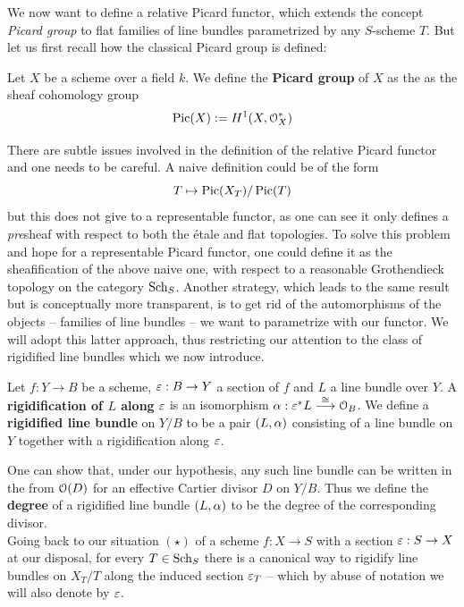 	We now want to define a relative Picard functor, which extends the concept \emph{Picard group} to flat families of line bundles parametrized by any $S$-scheme $T$. But let us first recall how the classical Picard group is defined:
	\begin{defi}
		Let $X$ be a scheme over a field $k$. We define the \textbf{Picard group} of $X$ as the as the sheaf cohomology group
		$$ \operatorname{Pic}(X) := H^1(X, \mathcal{O}_X^*) $$
	\end{defi}
	There are subtle issues involved in the definition of the relative Picard functor and one needs to be careful. A naive definition could be of the form
	$$ T \mapsto \operatorname{Pic}(X_T)/\operatorname{Pic}(T) $$
	but this does not give to a representable functor, as one can see it only defines a \emph{pre}sheaf with respect to both the \'etale and flat topologies. 
	To solve this problem and hope for a representable Picard functor, one could define it as the sheafification of the above naive one, with respect to a reasonable Grothendieck topology on the category $\operatorname{Sch}_S$. Another strategy, which leads to the same result but is conceptually more transparent, is to get rid of the automorphisms of the objects -- families of line bundles -- we want to parametrize with our functor. 
	We will adopt this latter approach, thus restricting our attention to the class of rigidified line bundles which we now introduce.
	\begin{defi}
		Let $f:Y\to B$ be a scheme, $\varepsilon:B\to Y$ a section of $f$ and $L$ a line bundle over $Y$.
		A \textbf{rigidification of $L$ along} $\varepsilon$ is an isomorphism $\alpha: \varepsilon^*L \overset{\cong}\longrightarrow \mathcal{O}_B $.
		We define a \textbf{rigidified line bundle} on $Y/B$ to be a pair $(L,\alpha)$ consisting of a line bundle on $Y$ together with a rigidification along $\varepsilon$.
	\end{defi}

	One can show that, under our hypothesis, any such line bundle can be written in the from $\mathcal{O}(D)$ for an effective Cartier divisor $D$ on $Y/B$. Thus we define the \textbf{degree} of a rigidified line bundle $(L,\alpha)$ to be the degree of the corresponding divisor.\\

	Going back to our situation $(\star)$ of a scheme $f:X\to S$ with a section $\varepsilon:S\to X$ at our disposal, for every $T\in \operatorname{Sch}_S$ there is a canonical way to rigidify line bundles on $X_T/T$ along the induced section $\varepsilon_T$ -- which by abuse of notation we will also denote by $\varepsilon$. 

